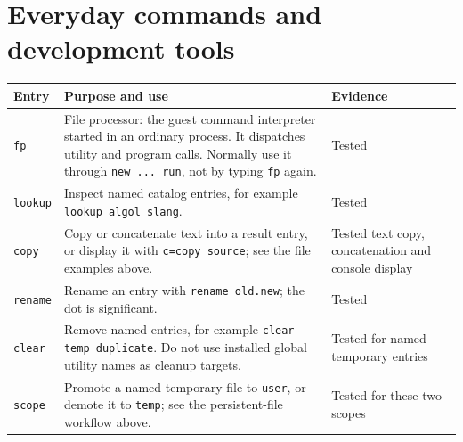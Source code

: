 \section{Everyday commands and development tools}\label{everyday-commands-and-development-tools}

\begin{longtable}[]{@{}
  >{\raggedright\arraybackslash}p{}
  >{\raggedright\arraybackslash}p{}
  >{\raggedright\arraybackslash}p{}@{}}
\toprule\noalign{}
\begin{minipage}[b]{\linewidth}\raggedright
Entry
\end{minipage} & \begin{minipage}[b]{\linewidth}\raggedright
Purpose and use
\end{minipage} & \begin{minipage}[b]{\linewidth}\raggedright
Evidence
\end{minipage} \\
\midrule\noalign{}
\endhead
\bottomrule\noalign{}
\endlastfoot
\passthrough{\lstinline!fp!} & File processor: the guest command interpreter started in an ordinary process. It dispatches utility and program calls. Normally use it through \passthrough{\lstinline!new ... run!}, not by typing \passthrough{\lstinline!fp!} again. & Tested \\
\passthrough{\lstinline!lookup!} & Inspect named catalog entries, for example \passthrough{\lstinline!lookup algol slang!}. & Tested \\
\passthrough{\lstinline!copy!} & Copy or concatenate text into a result entry, or display it with \passthrough{\lstinline!c=copy source!}; see the file examples above. & Tested text copy, concatenation and console display \\
\passthrough{\lstinline!rename!} & Rename an entry with \passthrough{\lstinline!rename old.new!}; the dot is significant. & Tested \\
\passthrough{\lstinline!clear!} & Remove named entries, for example \passthrough{\lstinline!clear temp duplicate!}. Do not use installed global utility names as cleanup targets. & Tested for named temporary entries \\
\passthrough{\lstinline!scope!} & Promote a named temporary file to \passthrough{\lstinline!user!}, or demote it to \passthrough{\lstinline!temp!}; see the persistent-file workflow above. & Tested for these two scopes \\

\end{longtable}
